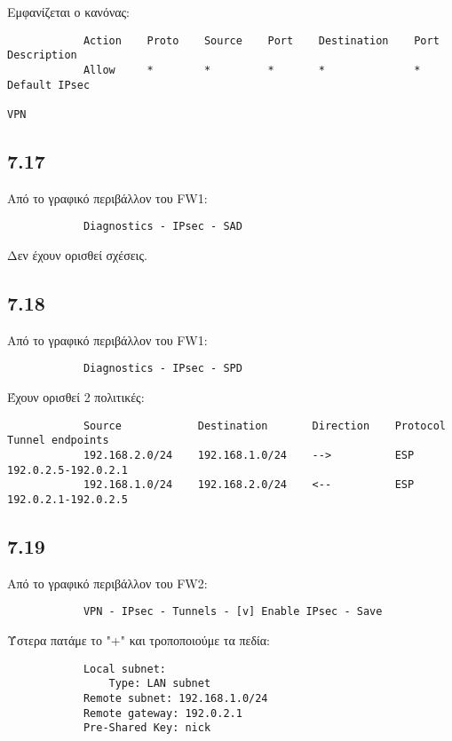 \documentclass[a4paper, 12pt]{article}
\begin{document}
		Εμφανίζεται ο κανόνας:
		
		\begin{verbatim}
			Action    Proto    Source    Port    Destination    Port    Description
			Allow     *        *         *       *              *       Default IPsec
			                                                            VPN
		\end{verbatim}

	\subsection*{7.17}
		Από το γραφικό περιβάλλον του FW1:
		
		\begin{verbatim}
			Diagnostics - IPsec - SAD
		\end{verbatim}
		
		Δεν έχουν ορισθεί σχέσεις. 

	\subsection*{7.18}
		Από το γραφικό περιβάλλον του FW1:
		
		\begin{verbatim}
			Diagnostics - IPsec - SPD
		\end{verbatim}
		
		Έχουν ορισθεί 2 πολιτικές:
		
		\begin{verbatim}
			Source            Destination       Direction    Protocol    Tunnel endpoints
			192.168.2.0/24    192.168.1.0/24    -->          ESP         192.0.2.5-192.0.2.1
			192.168.1.0/24    192.168.2.0/24    <--          ESP         192.0.2.1-192.0.2.5
		\end{verbatim}

	\subsection*{7.19}
		Από το γραφικό περιβάλλον του FW2:
		 
		\begin{verbatim}
			VPN - IPsec - Tunnels - [v] Enable IPsec - Save
		\end{verbatim}
		 
		Ύστερα πατάμε το "+" και τροποποιούμε τα πεδία:
		 
		\begin{verbatim}
		 	Local subnet: 
		 	    Type: LAN subnet 
		 	Remote subnet: 192.168.1.0/24
		 	Remote gateway: 192.0.2.1
		 	Pre-Shared Key: nick
		\end{verbatim}
\end{document}
